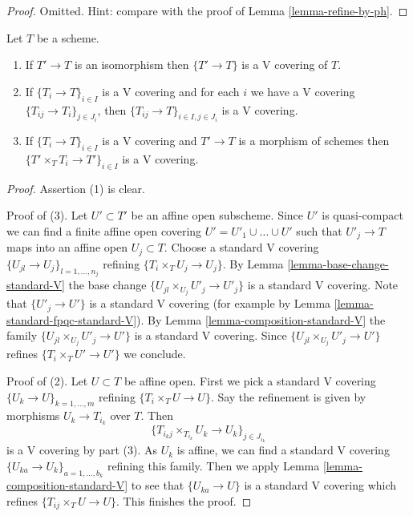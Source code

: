 \begin{proof}
Omitted. Hint: compare with the proof of
Lemma \ref{lemma-refine-by-ph}.
\end{proof}

\begin{lemma}
\label{lemma-V}
Let $T$ be a scheme.
\begin{enumerate}
\item If $T' \to T$ is an isomorphism then $\{T' \to T\}$
is a V covering of $T$.
\item If $\{T_i \to T\}_{i\in I}$ is a V covering and for each
$i$ we have a V covering $\{T_{ij} \to T_i\}_{j\in J_i}$, then
$\{T_{ij} \to T\}_{i \in I, j\in J_i}$ is a V covering.
\item If $\{T_i \to T\}_{i\in I}$ is a V covering
and $T' \to T$ is a morphism of schemes then
$\{T' \times_T T_i \to T'\}_{i\in I}$ is a V covering.
\end{enumerate}
\end{lemma}

\begin{proof}
Assertion (1) is clear.

\medskip\noindent
Proof of (3).
Let $U' \subset T'$ be an affine open subscheme.
Since $U'$ is quasi-compact we can find a finite affine open
covering $U' = U'_1 \cup \ldots \cup U'$ such that
$U'_j \to T$ maps into an affine open $U_j \subset T$.
Choose a standard V covering $\{U_{jl} \to U_j\}_{l = 1, \ldots, n_j}$
refining $\{T_i \times_T U_j \to U_j\}$.
By Lemma \ref{lemma-base-change-standard-V}
the base change $\{U_{jl} \times_{U_j} U'_j \to U'_j\}$
is a standard V covering. Note that $\{U'_j \to U'\}$
is a standard V covering
(for example by Lemma \ref{lemma-standard-fpqc-standard-V}).
By Lemma \ref{lemma-composition-standard-V} 
the family $\{U_{jl} \times_{U_j} U'_j \to U'\}$
is a standard V covering. Since
$\{U_{jl} \times_{U_j} U'_j \to U'\}$ refines $\{T_i \times_T U' \to U'\}$
we conclude.

\medskip\noindent
Proof of (2).
Let $U \subset T$ be affine open. First we pick a standard V covering
$\{U_k \to U\}_{k = 1, \ldots, m}$ refining
$\{T_i \times_T U \to U\}$.
Say the refinement is given by morphisms $U_k \to T_{i_k}$ over $T$.
Then
$$
\{T_{i_kj} \times_{T_{i_k}} U_k \to U_k\}_{j \in J_{i_k}}
$$
is a V covering by part (3). As $U_k$ is affine,
we can find a standard V covering
$\{U_{ka} \to U_k\}_{a = 1, \ldots, b_k}$ refining this family.
Then we apply Lemma \ref{lemma-composition-standard-V}
to see that $\{U_{ka} \to U\}$ is a standard V covering which
refines $\{T_{ij} \times_T U \to U\}$. This finishes the proof.
\end{proof}


